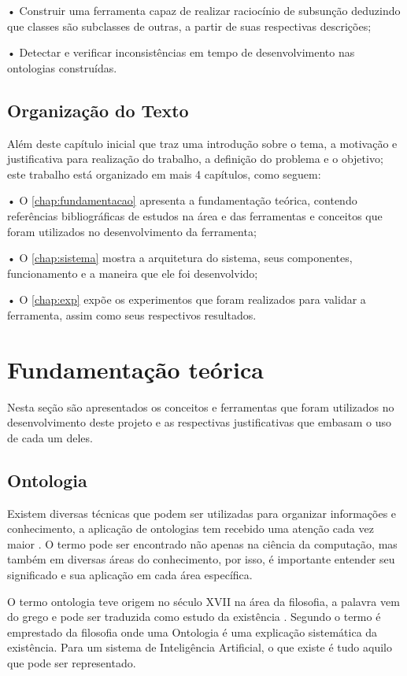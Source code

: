 \documentclass{bcc}
\begin{document}
•	Construir uma ferramenta capaz de realizar raciocínio de subsunção deduzindo que classes são subclasses de outras, a partir de suas respectivas descrições;

•	Detectar e verificar inconsistências em tempo de desenvolvimento nas ontologias construídas.

\section{Organização do Texto}

Além deste capítulo inicial que traz uma introdução sobre o tema, a motivação e justificativa para realização do trabalho, a definição do problema e o objetivo; este trabalho está organizado em mais 4 capítulos, como seguem:

• O \autoref{chap:fundamentacao} apresenta a fundamentação teórica, contendo referências bibliográficas de estudos na área e das ferramentas e conceitos que foram utilizados no desenvolvimento da ferramenta;

• O \autoref{chap:sistema} mostra a arquitetura do sistema, seus componentes, funcionamento e a maneira que ele foi desenvolvido;

• O \autoref{chap:exp} expõe os experimentos que foram realizados para validar a ferramenta, assim como seus respectivos resultados.


\chapter{Fundamentação teórica}
\label{chap:fundamentacao}

Nesta seção são apresentados os conceitos e ferramentas que foram utilizados no desenvolvimento deste projeto e as respectivas justificativas que embasam o uso de cada um deles.

\section{Ontologia}

Existem diversas técnicas que podem ser utilizadas para organizar informações e conhecimento, a aplicação de ontologias tem recebido uma atenção cada vez maior \cite{almeida2014}. O termo pode ser encontrado não apenas na ciência da computação, mas também em diversas áreas do conhecimento, por isso, é importante entender seu significado e sua aplicação em cada área específica.

O termo ontologia teve origem no século XVII na área da filosofia, a palavra vem do grego e pode ser traduzida como estudo da existência \cite{guizzardi2005}. Segundo \cite{gruber1995} o termo é emprestado da filosofia onde uma Ontologia é uma explicação sistemática da existência. Para um sistema de Inteligência Artificial, o que existe é tudo aquilo que pode ser representado.
\end{document}
